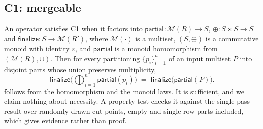 \documentclass[10pt,twocolumn,letterpaper]{article}   %
\newcommand{\Ca}{\textsc{C1}}
\begin{document}
\subsection{\Ca{}: mergeable}

An operator satisfies \Ca{} when it factors into
$\mathsf{partial}\colon \mathcal{M}(R) \rightarrow S$,
$\oplus\colon S \times S \rightarrow S$ and
$\mathsf{finalize}\colon S \rightarrow \mathcal{M}(R')$,
where $\mathcal{M}(\cdot)$ is a multiset, $(S,\oplus)$ is a commutative monoid with identity
$\varepsilon$, and $\mathsf{partial}$ is a monoid homomorphism from
$(\mathcal{M}(R),\uplus)$. Then for every partitioning $\{p_i\}_{i=1}^{n}$ of an input
multiset $P$ into disjoint parts whose union preserves multiplicity,
\begin{equation}
\mathsf{finalize}\Big(\textstyle\bigoplus_{i=1}^{n} \mathsf{partial}(p_i)\Big)
  \;=\; \mathsf{finalize}\big(\mathsf{partial}(P)\big).
\label{eq:merge}
\end{equation}
 follows from the homomorphism and the monoid laws. It is sufficient, and we
claim nothing about necessity. A property test checks it against the single-pass result over
randomly drawn cut points, empty and single-row parts included, which gives evidence rather
than proof.
\end{document}
